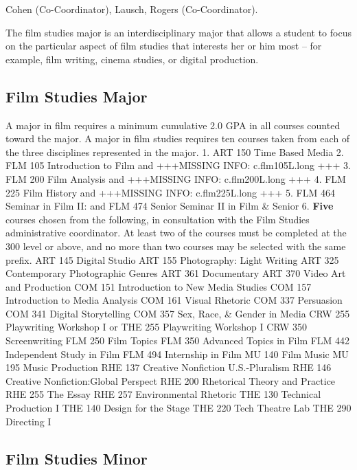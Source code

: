 \documentclass[
  letterpaper,
]{scrbook}
\begin{document}
Cohen (Co-Coordinator), Lausch, Rogers (Co-Coordinator).

The film studies major is an interdisciplinary major that allows a
student to focus on the particular aspect of film studies that interests
her or him most -- for example, film writing, cinema studies, or digital
production.

\subsection{Film Studies Major}\label{film-studies-major}

A major in film requires a minimum cumulative 2.0 GPA in all courses
counted toward the major. A major in film studies requires ten courses
taken from each of the three disciplines represented in the major. 1.
ART 150 Time Based Media 2. FLM 105 Introduction to Film and +++MISSING
INFO: c.flm105L.long +++ 3. FLM 200 Film Analysis and +++MISSING INFO:
c.flm200L.long +++ 4. FLM 225 Film History and +++MISSING INFO:
c.flm225L.long +++ 5. FLM 464 Seminar in Film II: and FLM 474 Senior
Seminar II in Film \& Senior 6. \textbf{Five} courses chosen from the
following, in consultation with the Film Studies administrative
coordinator. At least two of the courses must be completed at the 300
level or above, and no more than two courses may be selected with the
same prefix. ART 145 Digital Studio ART 155 Photography: Light Writing
ART 325 Contemporary Photographic Genres ART 361 Documentary ART 370
Video Art and Production COM 151 Introduction to New Media Studies COM
157 Introduction to Media Analysis COM 161 Visual Rhetoric COM 337
Persuasion COM 341 Digital Storytelling COM 357 Sex, Race, \& Gender in
Media CRW 255 Playwriting Workshop I or THE 255 Playwriting Workshop I
CRW 350 Screenwriting FLM 250 Film Topics FLM 350 Advanced Topics in
Film FLM 442 Independent Study in Film FLM 494 Internship in Film MU 140
Film Music MU 195 Music Production RHE 137 Creative Nonfiction
U.S.-Pluralism RHE 146 Creative Nonfiction:Global Perspect RHE 200
Rhetorical Theory and Practice RHE 255 The Essay RHE 257 Environmental
Rhetoric THE 130 Technical Production I THE 140 Design for the Stage THE
220 Tech Theatre Lab THE 290 Directing I

\subsection{Film Studies Minor}\label{film-studies-minor}
\end{document}
